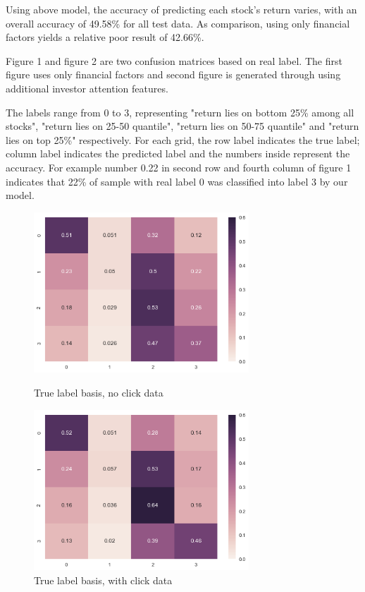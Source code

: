 \documentclass[letterpaper]{article}
\begin{document}
Using above model, the accuracy of predicting each stock's return varies, with an overall accuracy of 49.58\% for all test data. As comparison, using only financial factors yields a relative poor result of 42.66\%.

Figure 1 and figure 2 are two confusion matrices based on real label. The first figure uses only financial factors and second figure is generated through using additional investor attention features.

The labels range from $0$ to $3$, representing "return lies on bottom 25\% among all stocks", "return lies on 25-50 quantile", "return lies on 50-75 quantile" and "return lies on top 25\%" respectively. For each grid, the row label indicates the true label; column label indicates the predicted label and the numbers inside represent the accuracy. For example number 0.22 in second row and fourth column of figure 1 indicates that 22\% of sample with real label 0 was classified into label 3 by our model.

\begin{figure}[htbp]
  \begin{minipage}[t]{0.5\linewidth}
  \centering
  \includegraphics[width=0.72\textwidth]{heatmap_noclick.png}
  \caption{True label basis, no click data}
  \end{minipage}
  \begin{minipage}[t]{0.5\linewidth}
  \centering
  \includegraphics[width=0.72\textwidth]{heatmap_hasclick.png}
  \caption{True label basis, with click data}
  \end{minipage}
\end{figure}
\end{document}
